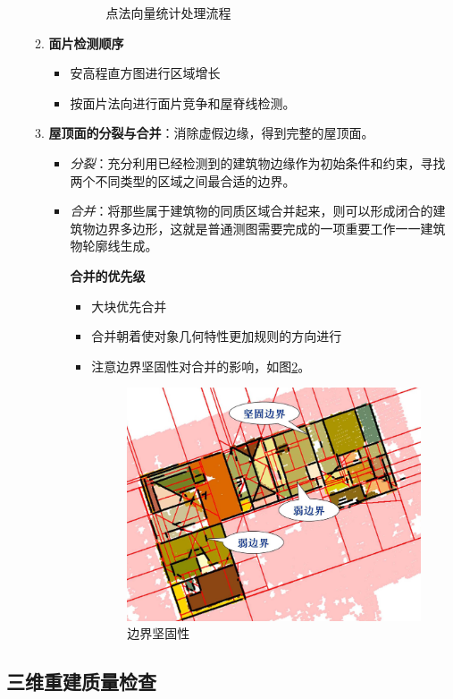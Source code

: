 \begin{enumerate}
\begin{enumerate}
\begin{itemize}
\begin{figure}[htbp]
						\caption{点法向量统计处理流程}
						\label{fig:点法向量统计处理流程}
					\end{figure}
				\end{itemize}
			\item \textbf{面片检测顺序}
				\begin{itemize}
					\item 安高程直方图进行区域增长
					\item 按面片法向进行面片竞争和屋脊线检测。
				\end{itemize}
			\item \textbf{屋顶面的分裂与合并}：消除虚假边缘，得到完整的屋顶面。
				\begin{itemize}
					\item \textit{分裂}：充分利用已经检测到的建筑物边缘作为初始条件和约束，寻找两个不同类型的区域之间最合适的边界。
					\item \textit{合并}：将那些属于建筑物的同质区域合并起来，则可以形成闭合的建筑物边界多边形，这就是普通测图需要完成的一项重要工作一一建筑物轮廓线生成。
					
					\textbf{合并的优先级}
						\begin{itemize}
							\item 大块优先合并
							\item 合并朝着使对象几何特性更加规则的方向进行
							\item 注意边界坚固性对合并的影响，如图\ref{fig:边界坚固性}。
								\begin{figure}[htbp]
									\centering
									\includegraphics[width=0.5\linewidth]{figure/Chapter6/边界坚固性}
									\caption{边界坚固性}
									\label{fig:边界坚固性}
								\end{figure}
						\end{itemize}
				\end{itemize}
		\end{enumerate}
\end{enumerate}

\subsection{三维重建质量检查}

